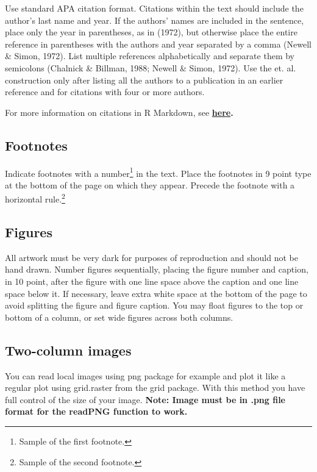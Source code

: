 \documentclass[10pt, letterpaper]{article}
\begin{document}
Use standard APA citation format. Citations within the text should
include the author's last name and year. If the authors' names are
included in the sentence, place only the year in parentheses, as in
(1972), but otherwise place the entire reference in parentheses with the
authors and year separated by a comma (Newell \& Simon, 1972). List
multiple references alphabetically and separate them by semicolons
(Chalnick \& Billman, 1988; Newell \& Simon, 1972). Use the et. al.
construction only after listing all the authors to a publication in an
earlier reference and for citations with four or more authors.

For more information on citations in R Markdown, see
\textbf{\href{http://rmarkdown.rstudio.com/authoring_bibliographies_and_citations.html\#citations}{here}.}

\subsection{Footnotes}\label{footnotes}

Indicate footnotes with a number\footnote{Sample of the first
footnote.} in the text. Place the footnotes in 9 point type at the
bottom of the page on which they appear. Precede the footnote with a
horizontal rule.\footnote{Sample of the second footnote.}

\subsection{Figures}\label{figures}

All artwork must be very dark for purposes of reproduction and should
not be hand drawn. Number figures sequentially, placing the figure
number and caption, in 10 point, after the figure with one line space
above the caption and one line space below it. If necessary, leave extra
white space at the bottom of the page to avoid splitting the figure and
figure caption. You may float figures to the top or bottom of a column,
or set wide figures across both columns.

\subsection{Two-column images}\label{two-column-images}

You can read local images using png package for example and plot it like
a regular plot using grid.raster from the grid package. With this method
you have full control of the size of your image. \textbf{Note: Image
must be in .png file format for the readPNG function to work.}
\end{document}
